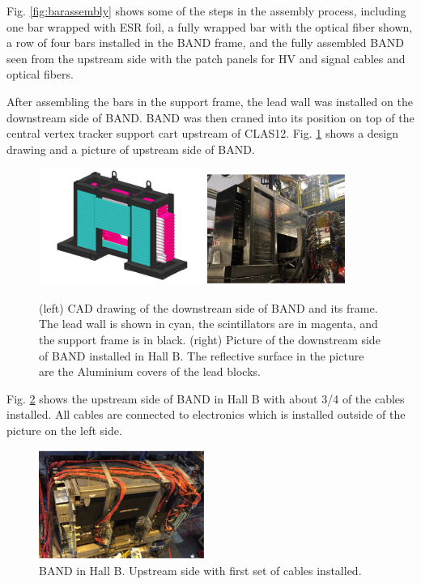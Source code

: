 \documentclass[3p,final,twocolumn]{elsarticle}
\begin{document}
Fig. \ref{fig:barassembly} shows some of the steps in the assembly process,
including one bar wrapped with ESR foil, a fully wrapped bar with the
optical fiber shown, a row of four bars installed in the BAND frame,
and the fully assembled BAND seen from the upstream side with the
patch panels for HV and  signal cables and optical fibers.


After assembling the bars in the support frame, the lead wall was
installed on the downstream side of BAND. BAND was then
craned into its position on top of the central vertex tracker support
cart upstream of CLAS12. Fig. \ref{fig:band_downstream} shows a
design drawing and a picture of upstream side of BAND. 
\begin{figure}[th]
	\centering
	\includegraphics[width=0.48\textwidth]{BAND_1-2.png} 
	\includegraphics[width=0.40\textwidth]{pic-bandinhall1.pdf}
		\caption{(left) CAD drawing of the downstream side of BAND and its frame. The lead wall is shown in cyan, the scintillators
          are in magenta, and the support frame is in black. (right) Picture of the downstream side of BAND installed in Hall B. The reflective surface in the picture are the Aluminium covers of the lead blocks.}
		\label{fig:band_downstream}
\end{figure}

Fig. \ref{fig:bandinhall} shows the upstream side of BAND in Hall B with about 3/4 of the cables installed. All cables are connected to
electronics which is installed outside of the picture on the left side.
\begin{figure}[tb]
	\centering
	\includegraphics[width=0.48\textwidth]{pic-bandinhall2.pdf}
				\caption{BAND in Hall B. Upstream side with first set of cables installed.}
		\label{fig:bandinhall}
\end{figure}
\end{document}

